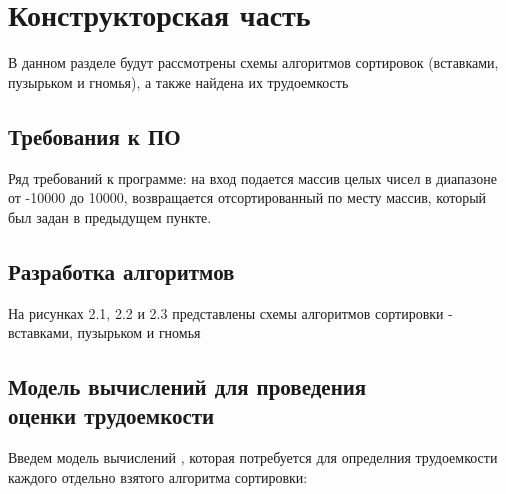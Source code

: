 \chapter{Конструкторская часть}
В данном разделе будут рассмотрены схемы алгоритмов сортировок (вставками, пузырьком и гномья), а также найдена их трудоемкость

\section{Требования к ПО}
Ряд требований к программе: на вход подается массив целых чисел в диапазоне от -10000 до 10000, возвращается отсортированный по месту массив, который был задан в предыдущем пункте. \newline

\section{Разработка алгоритмов}
На рисунках 2.1, 2.2 и 2.3 представлены схемы алгоритмов сортировки - вставками, пузырьком и гномья


\clearpage

\section[Модель вычислений для проведения оценки трудоемкости]{Модель вычислений для проведения\\ оценки трудоемкости}
Введем модель вычислений \cite{model}, которая потребуется для определния трудоемкости каждого отдельно взятого алгоритма сортировки:

